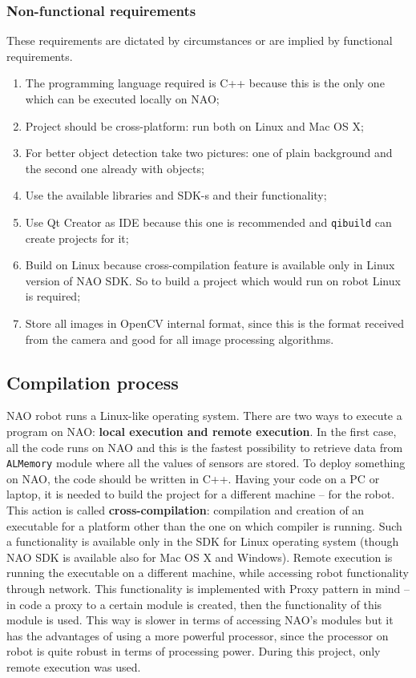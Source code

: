         \subsubsection{Non-functional requirements}
            \noindent These requirements are dictated by circumstances or are implied by functional requirements. 
            \begin{enumerate}[topsep=2pt, partopsep=0pt,itemsep=0pt,parsep=1pt]
                \item The programming language required is C++ because this is the only one which can be executed locally on NAO;
                \item Project should be cross-platform: run both on Linux and Mac OS X;
                \item For better object detection take two pictures: one of plain background and the second one already with objects;
                \item Use the available libraries and SDK-s and their functionality;
                \item Use Qt Creator as IDE because this one is recommended and \verb|qibuild| can create projects for it;
                \item Build on Linux because cross-compilation feature is available only in Linux version of NAO SDK. So to build a project which would run on robot Linux is required;
                \item Store all images in OpenCV internal format, since this is the format received from the camera and good for all image processing algorithms.
            \end{enumerate}\itemsep0pt


    \subsection{Compilation process}
            NAO robot runs a Linux-like operating system. There are two ways to execute a program on NAO: \textbf{local execution and remote execution}. In the first case, all the code runs on NAO and this is the fastest possibility to retrieve data from \verb|ALMemory| module where all the values of sensors are stored. To deploy something on NAO, the code should be written in C++. Having your code on a PC or laptop, it is needed to build the project for a different machine -- for the robot. This action is called \textbf{cross-compilation}: compilation and creation of an executable for a platform other than the one on which compiler is running. Such a functionality is available only in the SDK for Linux operating system (though NAO SDK is available also for Mac OS X and Windows). Remote execution is running the executable on a different machine, while accessing robot functionality through network. This functionality is implemented with Proxy pattern in mind -- in code a proxy to a certain module is created, then the functionality of this module is used. This way is slower in terms of accessing NAO's modules but it has the advantages of using a more powerful processor, since the processor on robot is quite robust in terms of processing power. During this project, only remote execution was used.

